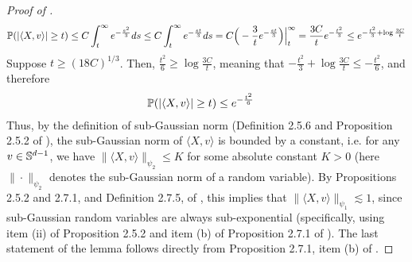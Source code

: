 \begin{proof}[Proof of ]
\begin{align}
\mathbb{P}(|\langle X, v \rangle| \geq t)
 \leq C \int_t^\infty e^{-\frac{s^2}{3}} ds
 \leq C \int_t^\infty e^{-\frac{st}{3}} ds
 = C \Big(-\frac{3}{t} e^{-\frac{st}{3}} \Big)\Big|_t^\infty
 = \frac{3C}{t} e^{-\frac{t^2}{3}}
 \leq e^{-\frac{t^2}{3} + \log \frac{3C}{t}}
\end{align}
Suppose $t \geq (18 C)^{1/3}$. Then, $\frac{t^2}{6} \geq \log \frac{3C}{t}$, meaning that $-\frac{t^2}{3} + \log \frac{3C}{t} \leq -\frac{t^2}{6}$, and therefore
\begin{align}
\mathbb{P}(|\langle X, v \rangle| \geq t)
& \leq e^{-\frac{t^2}{6}}
\end{align}
Thus, by the definition of sub-Gaussian norm (Definition 2.5.6 and Proposition 2.5.2 of \citet{vershynin2018high}), the sub-Gaussian norm of $\langle X, v \rangle$ is bounded by a constant, i.e. for any $v \in \mathbb{S}^{d - 1}$, we have $\| \langle X, v \rangle\|_{\psi_2} \leq K$ for some absolute constant $K > 0$ (here $\| \cdot \|_{\psi_2}$ denotes the sub-Gaussian norm of a random variable). By Propositions 2.5.2 and 2.7.1, and Definition 2.7.5, of \citet{vershynin2018high}, this implies that $\| \langle X, v \rangle\|_{\psi_1} \lesssim 1$, since sub-Gaussian random variables are always sub-exponential (specifically, using item (ii) of Proposition 2.5.2 and item (b) of Proposition 2.7.1 of \citet{vershynin2018high}). The last statement of the lemma follows directly from Proposition 2.7.1, item (b) of \citet{vershynin2018high}.
\end{proof}

